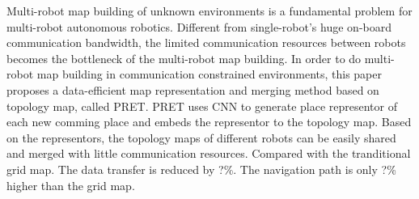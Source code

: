 Multi-robot map building of unknown environments is a fundamental problem for multi-robot autonomous robotics. 
Different from single-robot's huge on-board communication bandwidth, the limited communication resources between robots becomes the bottleneck of the multi-robot map building.
In order to do multi-robot map building in communication constrained environments, this paper proposes a data-efficient map representation and merging method based on topology map, called PRET.
PRET uses CNN to generate place representor of each new comming place and embeds the representor to the topology map.
Based on the representors, the topology maps of different robots can be easily shared and merged with little communication resources.
Compared with the tranditional grid map. The data transfer is reduced by ?\%. The navigation path is only ?\% higher than the grid map. %